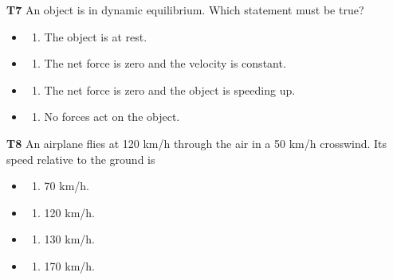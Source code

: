 \documentclass[
]{article}
\providecommand{\tightlist}{%
  \setlength{\itemsep}{0pt}\setlength{\parskip}{0pt}}
\begin{document}
\textbf{T7} An object is in dynamic equilibrium. Which statement must be
true?

\begin{itemize}
\tightlist
\item
  \begin{enumerate}
  \def\labelenumi{\Alph{enumi})}
  \tightlist
  \item
    The object is at rest.
  \end{enumerate}
\item
  \begin{enumerate}
  \def\labelenumi{\Alph{enumi})}
  \setcounter{enumi}{1}
  \tightlist
  \item
    The net force is zero and the velocity is constant.
  \end{enumerate}
\item
  \begin{enumerate}
  \def\labelenumi{\Alph{enumi})}
  \setcounter{enumi}{2}
  \tightlist
  \item
    The net force is zero and the object is speeding up.
  \end{enumerate}
\item
  \begin{enumerate}
  \def\labelenumi{\Alph{enumi})}
  \setcounter{enumi}{3}
  \tightlist
  \item
    No forces act on the object.
  \end{enumerate}
\end{itemize}

\textbf{T8} An airplane flies at 120 km/h through the air in a 50 km/h
crosswind. Its speed relative to the ground is

\begin{itemize}
\tightlist
\item
  \begin{enumerate}
  \def\labelenumi{\Alph{enumi})}
  \tightlist
  \item
    70 km/h.
  \end{enumerate}
\item
  \begin{enumerate}
  \def\labelenumi{\Alph{enumi})}
  \setcounter{enumi}{1}
  \tightlist
  \item
    120 km/h.
  \end{enumerate}
\item
  \begin{enumerate}
  \def\labelenumi{\Alph{enumi})}
  \setcounter{enumi}{2}
  \tightlist
  \item
    130 km/h.
  \end{enumerate}
\item
  \begin{enumerate}
  \def\labelenumi{\Alph{enumi})}
  \setcounter{enumi}{3}
  \tightlist
  \item
    170 km/h.
  \end{enumerate}
\end{itemize}
\end{document}

